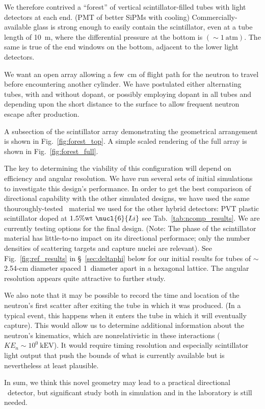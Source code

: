 We therefore contrived a ``forest'' of vertical scintillator-filled tubes with light detectors at each end. (PMT of better SiPMs with cooling)
Commercially-available glass is strong enough to easily contain the scintillator, even at a tube length of 10~m, where the differential pressure at the bottom is $(\sim 1~\mathrm{atm})$.
The same is true of the end windows on the bottom, adjacent to the lower light detectors.

We want an open array allowing a few~cm of flight path for the neutron to travel before encountering another cylinder. 
We have postulated either alternating tubes, with and without dopant, or possibly employing dopant in all tubes and depending upon the short distance to the surface to allow frequent neutron escape after production.

A subsection of the scintillator array demonstrating the geometrical arrangement is shown in Fig.~\ref{fig:forest_top}.
A simple scaled rendering of the full array is shown in Fig.~\ref{fig:forest_full}.

The key to determining the viability of this configuration will depend on efficiency and angular resolution.
We have run several sets of initial simulations to investigate this design's performance.
In order to get the best comparison of directional capability with the other simulated designs, we have used the same thouroughly-tested \rat\ material we used for the other hybrid detectors: PVT plastic scintillator doped at $1.5\%\mathrm{wt}\ \nucl{6}{Li}$ \dash see Tab.~\ref{tab:ncomp_results}.
We are currently testing options for the final design.
(Note: The phase of the scintillator material has little-to-no impact on its directional performace; only the number densities of scattering targets and capture nuclei are relevant).
See Fig.~\ref{fig:ref_results} in \S~\ref{sec:deltaphi} below for our initial results for tubes of $\sim$2.54-cm diameter spaced 1~diameter apart in a hexagonal lattice.
The angular resolution appears quite attractive to further study.

We also note that it may be possible to record the time and location of the neutron's first scatter after exiting the tube in which it was produced.
(In a typical event, this happens when it enters the tube in which it will eventually capture).
This would allow us to determine additional information about the neutron's kinematics, which are nonrelativistic in these interactions ($KE_n\sim10^{0}~\mathrm{kEV}$).
It would require timing resolution and especially scintillator light output that push the bounds of what is currently available but is nevertheless at least plausible.

In sum, we think this novel geometry may lead to a practical directional \ibd\ detector, but significant study both in simulation and in the laboratory is still needed.
